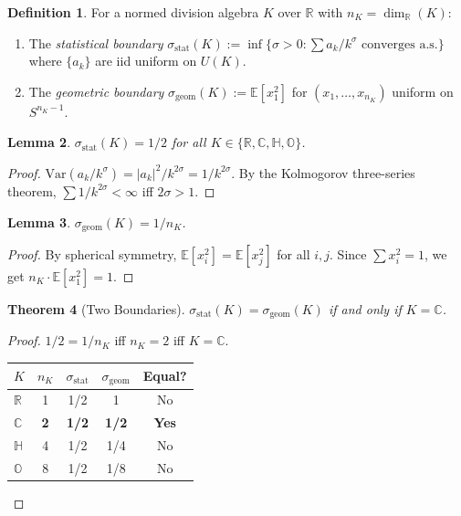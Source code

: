 \documentclass[12pt]{article}
\newtheorem{theorem}{Theorem}[section]
\newtheorem{lemma}[theorem]{Lemma}
\theoremstyle{definition}
\newtheorem{definition}[theorem]{Definition}
\theoremstyle{remark}
\newcommand{\CC}{\mathbb{C}}
\newcommand{\RR}{\mathbb{R}}
\newcommand{\HH}{\mathbb{H}}
\newcommand{\OO}{\mathbb{O}}
\begin{document}
\begin{definition}
For a normed division algebra $K$ over $\RR$ with $n_K = \dim_\RR(K)$:
\begin{enumerate}[label=(\alph*)]
\item The \emph{statistical boundary}
  $\sigma_{\mathrm{stat}}(K) :=
  \inf\{\sigma > 0 : \sum a_k/k^\sigma \text{ converges a.s.}\}$
  where $\{a_k\}$ are iid uniform on $U(K)$.
\item The \emph{geometric boundary}
  $\sigma_{\mathrm{geom}}(K) := \mathbb{E}[x_1^2]$
  for $(x_1, \ldots, x_{n_K})$ uniform on $S^{n_K - 1}$.
\end{enumerate}
\end{definition}

\begin{lemma}\label{lem:stat}
$\sigma_{\mathrm{stat}}(K) = 1/2$ for all $K \in \{\RR, \CC, \HH, \OO\}$.
\end{lemma}
\begin{proof}
$\mathrm{Var}(a_k/k^\sigma) = |a_k|^2/k^{2\sigma} = 1/k^{2\sigma}$.
By the Kolmogorov three-series theorem,
$\sum 1/k^{2\sigma} < \infty$ iff $2\sigma > 1$.
\end{proof}

\begin{lemma}\label{lem:geom}
$\sigma_{\mathrm{geom}}(K) = 1/n_K$.
\end{lemma}
\begin{proof}
By spherical symmetry,
$\mathbb{E}[x_i^2] = \mathbb{E}[x_j^2]$ for all $i, j$.
Since $\sum x_i^2 = 1$, we get $n_K \cdot \mathbb{E}[x_1^2] = 1$.
\end{proof}

\begin{theorem}[Two Boundaries]\label{thm:two}
$\sigma_{\mathrm{stat}}(K) = \sigma_{\mathrm{geom}}(K)$
if and only if $K = \CC$.
\end{theorem}
\begin{proof}
$1/2 = 1/n_K$ iff $n_K = 2$ iff $K = \CC$.

\begin{center}
\begin{tabular}{lcccc}
\toprule
$K$ & $n_K$ & $\sigma_{\mathrm{stat}}$ & $\sigma_{\mathrm{geom}}$ & Equal? \\
\midrule
$\RR$ & 1 & 1/2 & 1 & No \\
$\CC$ & \textbf{2} & \textbf{1/2} & \textbf{1/2} & \textbf{Yes} \\
$\HH$ & 4 & 1/2 & 1/4 & No \\
$\OO$ & 8 & 1/2 & 1/8 & No \\
\bottomrule
\end{tabular}
\end{center}
\vspace{-1em}
\end{proof}
\end{document}
